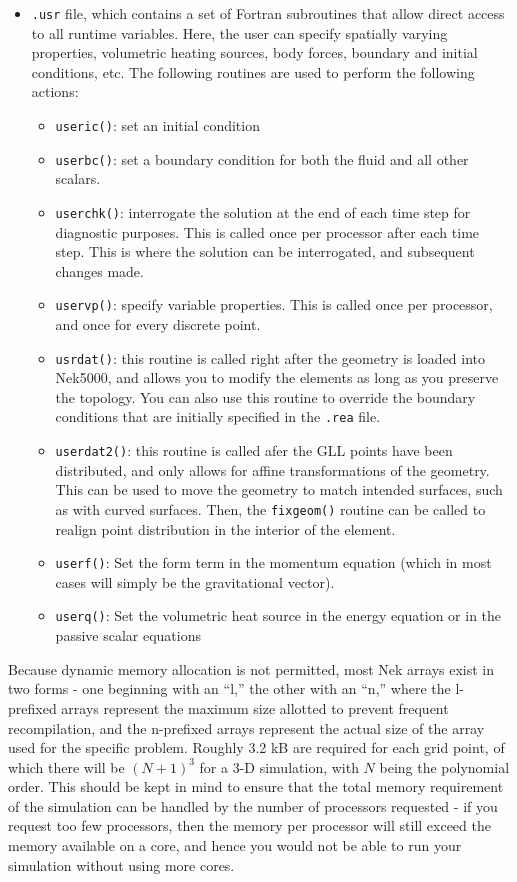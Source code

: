 \documentclass[10pt]{article}
\numberwithin{equation}{section} %
\begin{document}
\begin{itemize}
\item {\tt .usr} file, which contains a set of Fortran subroutines that allow direct access to all runtime variables. Here, the user can specify spatially varying properties, volumetric heating sources, body forces, boundary and initial conditions, etc. The following routines are used to perform the following actions:
	\begin{itemize}
	\item {\tt useric()}: set an initial condition
	\item {\tt userbc()}: set a boundary condition for both the fluid and all other scalars. 
	\item {\tt userchk()}: interrogate the solution at the end of each time step for diagnostic purposes. This is called once per processor after each time step. This is where the solution can be interrogated, and subsequent changes made.
	\item {\tt uservp()}: specify variable properties. This is called once per processor, and once for every discrete point.
	\item {\tt usrdat()}: this routine is called right after the geometry is loaded into Nek5000, and allows you to modify the elements as long as you preserve the topology. You can also use this routine to override the boundary conditions that are initially specified in the {\tt .rea} file. 
	\item {\tt userdat2()}: this routine is called afer the GLL points have been distributed, and only allows for affine transformations of the geometry. This can be used to move the geometry to match intended surfaces, such as with curved surfaces. Then, the {\tt fixgeom()} routine can be called to realign point distribution in the interior of the element.
	\item {\tt userf()}: Set the form term in the momentum equation (which in most cases will simply be the gravitational vector). 
	\item {\tt userq()}: Set the volumetric heat source in the energy equation or in the passive scalar equations
	\end{itemize}
\end{itemize}

Because dynamic memory allocation is not permitted, most Nek arrays exist in two forms - one beginning with an ``l,'' the other with an ``n,'' where the l-prefixed arrays represent the maximum size allotted to prevent frequent recompilation, and the n-prefixed arrays represent the actual size of the array used for the specific problem. Roughly 3.2 kB are required for each grid point, of which there will be \((N+1)^3\) for a 3-D simulation, with \(N\) being the polynomial order. This should be kept in mind to ensure that the total memory requirement of the simulation can be handled by the number of processors requested - if you request too few processors, then the memory per processor will still exceed the memory available on a core, and hence you would not be able to run your simulation without using more cores.
\end{document}
